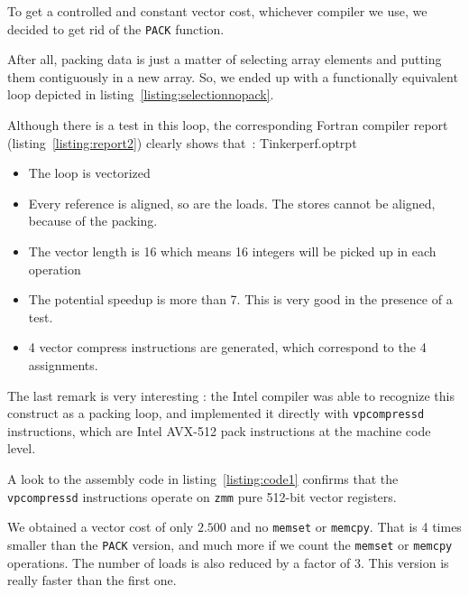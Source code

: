 \documentclass[9pt,comparison]{livecoms}
\newcommand{\lv}{\Large\verb}
\begin{document}
To get a controlled and constant vector cost, whichever compiler we use, we decided to get rid of the {\color{blue}\lv|PACK|} function. 

After all, packing data is just a matter of selecting array elements and putting them contiguously in a new array. So, we ended up with a functionally equivalent loop depicted in listing~\ref{listing:selectionnopack}.

Although there is a test in this loop, the corresponding Fortran compiler report (listing~\ref{listing:report2})  clearly shows that~:
 {Tinkerperf.optrpt}
\begin{itemize}
    \item The loop is vectorized
    \item Every reference is aligned, so are the loads. The stores cannot be aligned, because of the packing.
    \item The vector length is 16 which means 16 integers will be picked up in each operation
    \item The potential speedup is more than 7. This is very good in the presence of a test. 
    \item 4 vector compress instructions are generated, which correspond to the 4 assignments.
\end{itemize}

The last remark is very interesting : the Intel compiler was able to recognize this construct as a packing loop, and implemented it directly with {\color{codegreen}\lv|vpcompressd|} instructions, which are Intel AVX-512 pack instructions at the machine code level. 

A look to the assembly code in listing~\ref{listing:code1} confirms that the {\color{codegreen}\lv|vpcompressd|} instructions operate on {\color{red}\lv|zmm|} pure 512-bit vector registers.



We obtained a vector cost of only $2.500$ and no {\color{codegreen}\lv|memset|} or {\color{codegreen}\lv|memcpy|}. That is 4 times smaller than the {\color{blue}\lv|PACK|} version, and much more if we count the {\color{codegreen}\lv|memset|} or {\color{codegreen}\lv|memcpy|} operations. The number of loads is also reduced by a factor of 3. This version is really faster than the first one.
\end{document}
